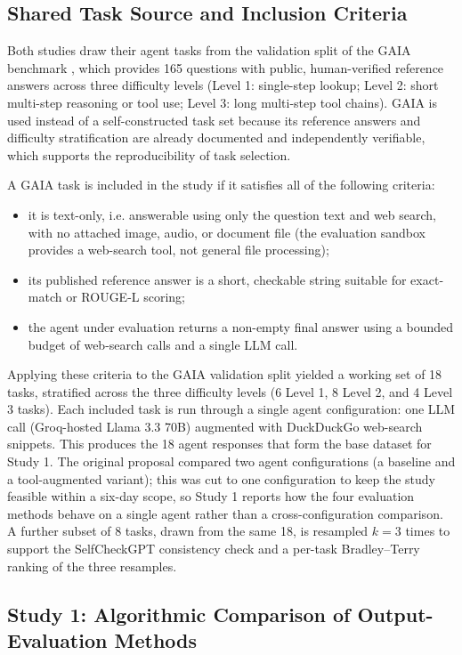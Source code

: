 \documentclass[conference]{IEEEtran}
\begin{document}
\subsection{Shared Task Source and Inclusion Criteria}
\label{sec:data}
Both studies draw their agent tasks from the validation split of the GAIA benchmark \cite{mialon2023gaia}, which provides 165 questions with public, human-verified reference answers across three difficulty levels (Level 1: single-step lookup; Level 2: short multi-step reasoning or tool use; Level 3: long multi-step tool chains). GAIA is used instead of a self-constructed task set because its reference answers and difficulty stratification are already documented and independently verifiable, which supports the reproducibility of task selection.

A GAIA task is included in the study if it satisfies all of the following criteria:
\begin{itemize}
\item it is text-only, i.e. answerable using only the question text and web search, with no attached image, audio, or document file (the evaluation sandbox provides a web-search tool, not general file processing);
\item its published reference answer is a short, checkable string suitable for exact-match or ROUGE-L scoring;
\item the agent under evaluation returns a non-empty final answer using a bounded budget of web-search calls and a single LLM call.
\end{itemize}
Applying these criteria to the GAIA validation split yielded a working set of 18 tasks, stratified across the three difficulty levels (6 Level 1, 8 Level 2, and 4 Level 3 tasks). Each included task is run through a single agent configuration: one LLM call (Groq-hosted Llama 3.3 70B) augmented with DuckDuckGo web-search snippets. This produces the 18 agent responses that form the base dataset for Study 1. The original proposal compared two agent configurations (a baseline and a tool-augmented variant); this was cut to one configuration to keep the study feasible within a six-day scope, so Study 1 reports how the four evaluation methods behave on a single agent rather than a cross-configuration comparison. A further subset of 8 tasks, drawn from the same 18, is resampled $k=3$ times to support the SelfCheckGPT consistency check and a per-task Bradley--Terry ranking of the three resamples.

\subsection{Study 1: Algorithmic Comparison of Output-Evaluation Methods}
\label{sec:study1}
\end{document}
